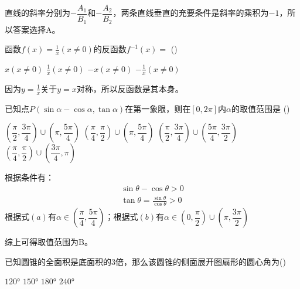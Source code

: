 \documentclass[answers]{exam}
\begin{document}
\begin{questions}
	\begin{solution}
		直线的斜率分别为$-\dfrac{A_1}{B_1}$和$-\dfrac{A_2}{B_2}$，两条直线垂直的充要条件是斜率的乘积为$-1$，所以答案选择A。
	\end{solution}

	\question 函数$f(x)=\frac1x(x\neq0)$的反函数$f^{-1}(x)=$ \hfill (\hspace{1cm})

	\begin{oneparchoices}
		\choice $x ( x\neq0)$ \CorrectChoice $\frac1x(x\neq0)$ \choice $-x (x\neq0)$ \choice $-\frac1x (x\neq0)$
	\end{oneparchoices}
	\begin{solution}
		因为$y=\frac1x$关于$y=x$对称，所以反函数是其本身。
	\end{solution}

	\question 已知点$P(\sin\alpha-\cos\alpha, \tan\alpha)$在第一象限，则在$[0,2\pi]$内$\alpha$的取值范围是 \hfill
	(\hspace{1cm})

	\begin{choices}
		\choice $\left( \dfrac{\pi}{2}, \dfrac{3\pi}{4} \right) \cup \left( \pi, \dfrac{5\pi}{4} \right)$
		\CorrectChoice $\left( \dfrac{\pi}{4}, \dfrac{\pi}{2} \right) \cup \left( \pi, \dfrac{5\pi}{4} \right)$
		\choice $\left( \dfrac{\pi}{2}, \dfrac{3\pi}{4} \right) \cup \left( \dfrac{5\pi}{4}, \dfrac{3\pi}{2} \right)$
		\choice $\left( \dfrac{\pi}{4}, \dfrac{\pi}{2} \right) \cup \left( \dfrac{3\pi}{4}, \pi \right)$
	\end{choices}

	\begin{solution}
		根据条件有：
		\begin{align*}
			\sin\theta - \cos\theta > 0 \tag{a} \\
			\tan\theta = \frac{\sin\theta}{\cos\theta} > 0 \tag{b}
		\end{align*}
		根据式$(a)$有$\alpha \in \left( \dfrac{\pi}{4}, \dfrac{5\pi}{4} \right)$；根据式$(b)$有$\alpha \in \left( 0,
			\dfrac{\pi}{2} \right) \cup \left( \pi, \dfrac{3\pi}{2} \right)$

		综上可得取值范围为B。
	\end{solution}

	\question 已知圆锥的全面积是底面积的$3$倍，那么该圆锥的侧面展开图扇形的圆心角为\hfill (\hspace{1cm})

	\begin{oneparchoices}
		\choice $\ang{120}$
		\choice $\ang{150}$
		\CorrectChoice $\ang{180}$
		\choice $\ang{240}$
	\end{oneparchoices}


\end{questions}
\end{document}
